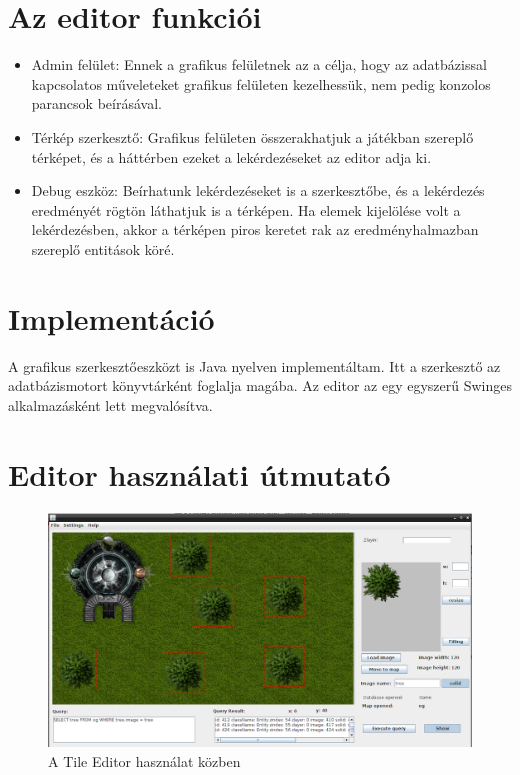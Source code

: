 
\section{Az editor funkciói}

\begin{itemize}
\item Admin felület: Ennek a grafikus felületnek az a célja, hogy az
adatbázissal kapcsolatos műveleteket grafikus felületen kezelhessük, nem pedig konzolos parancsok beírásával.
\item Térkép szerkesztő: Grafikus felületen összerakhatjuk a játékban szereplő térképet, és a háttérben ezeket a lekérdezéseket az editor adja ki.
\item Debug eszköz: Beírhatunk lekérdezéseket is a szerkesztőbe, és a lekérdezés eredményét rögtön láthatjuk is a térképen. Ha elemek kijelölése volt a lekérdezésben, akkor a térképen piros keretet rak az eredményhalmazban szereplő entitások köré.
	
\end{itemize}

\section{Implementáció}

A grafikus szerkesztőeszközt is Java nyelven implementáltam. Itt a szerkesztő az adatbázismotort könyvtárként foglalja magába. Az editor az egy egyszerű Swinges alkalmazásként lett megvalósítva. 

\section{Editor használati útmutató}

\begin{figure}[htb]
	\begin{center}
		\includegraphics[scale=0.34]{images/editor}
		\caption{A Tile Editor használat közben}
		\label{fig:editor}
	\end{center}
\end{figure}

